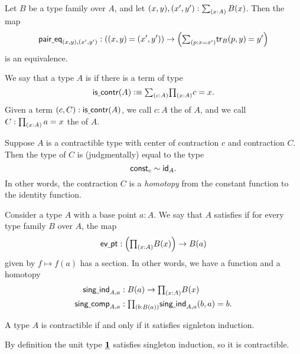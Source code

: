 \begin{cor}
Let $B$ be a type family over $A$, and let $\pairr{x,y},\pairr{x',y'}:\sm{x:A}B(x)$. Then the map
\begin{equation*}
\paireq_{(x,y),(x',y')} : (\id{\pairr{x,y}}{\pairr{x',y'}})\to \Big(\sm{p:x=x'}\id{\tr_B(p,y)}{y'}\Big)
\end{equation*}
is an equivalence.
\end{cor}

\begin{defn}
We say that a type $A$ is  if there is a term of type
\begin{equation*}
\iscontr(A) \defeq \sm{c:A}\prd{x:A}c=x.
\end{equation*}
Given a term $(c,C):\iscontr(A)$, we call $c:A$ the  of $A$, and we call $C:\prd{x:A}a=x$ the  of $A$.
\end{defn}

Suppose $A$ is a contractible type with center of contraction $c$ and contraction $C$. Then the type of $C$ is (judgmentally) equal to the type
\begin{equation*}
\const_c\htpy\idfunc[A].
\end{equation*}
In other words, the contraction $C$ is a \emph{homotopy} from the constant function to the identity function.

\begin{defn}
Consider a type $A$ with a base point $a:A$. We say that $A$ satisfies  if for every type family $B$ over $A$, the map
\begin{equation*}
\evpt:\Big(\prd{x:A}B(x)\Big)\to B(a)
\end{equation*}
given by $f\mapsto f(a)$ has a section. In other words, we have a function and a homotopy
\begin{align*}
\singind_{A,a} & : B(a)\to \prd{x:A}B(x) \\
\singcomp_{A,a} & : \prd{b:B(a)} \singind_{A,a}(b,a)=b.
\end{align*}
\end{defn}

\begin{prp}\label{thm:contractible}
A type $A$ is contractible if and only if it satisfies signleton induction.
\end{prp}

\begin{eg}
By definition the unit type $\unit$ satisfies singleton induction, so it is contractible.
\end{eg}

